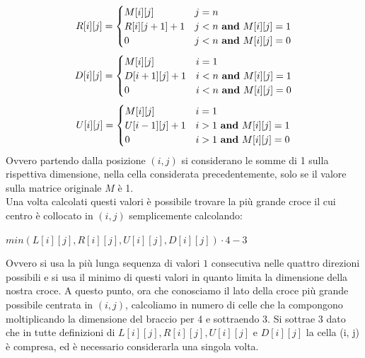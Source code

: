 \documentclass[../cheatSheetAlgoritmi.tex]{subfiles}
\begin{document}
\begin{equation*}
  	R[i][j] =\begin{cases}
    	M[i][j] & \text{$j = n$}\\
    	R[i][j+1] + 1 & \text{$j < n$ \textbf{and} $M[i][j] = 1$}\\
    	0 & \text{$j < n$ \textbf{and} $M[i][j] = 0$}
  	\end{cases}
\end{equation*}
\begin{equation*}
  	D[i][j] =\begin{cases}
    	M[i][j] & \text{$i = 1$}\\
    	D[i+1][j] + 1 & \text{$i < n$ \textbf{and} $M[i][j] = 1$}\\
    	0 & \text{$i < n$ \textbf{and} $M[i][j] = 0$}
  	\end{cases}
\end{equation*}
\begin{equation*}
  	U[i][j] =\begin{cases}
    	M[i][j] & \text{$i = 1$}\\
    	U[i-1][j] + 1 & \text{$i > 1$ \textbf{and} $M[i][j] = 1$}\\
    	0 & \text{$i > 1$ \textbf{and} $M[i][j] = 0$}
  	\end{cases}
\end{equation*}
Ovvero partendo dalla posizione $(i, j)$ si considerano le somme di 1 sulla rispettiva dimensione, nella cella considerata precedentemente, solo se il valore sulla matrice originale $M$ è 1. \\
Una volta calcolati questi valori è possibile trovare la più grande croce il cui centro è collocato in $(i, j)$ semplicemente calcolando: 
\begin{center}
$min(L[i][j], R[i][j], U[i][j], D[i][j]) \cdot 4 - 3$
\end{center}
Ovvero si usa la più lunga sequenza di valori $1$ consecutiva nelle quattro direzioni possibili e si usa il minimo di questi valori in quanto limita la dimensione della nostra croce. A questo punto, ora che conosciamo il lato della croce più grande possibile centrata in $(i, j)$, calcoliamo in numero di celle che la compongono moltiplicando la dimensione del braccio per 4 e sottraendo 3. Si sottrae 3 dato che in tutte definizioni di $L[i][j], R[i][j], U[i][j]$ e $D[i][j]$ la cella (i, j) è compresa, ed è necessario considerarla una singola volta.
\end{document}
